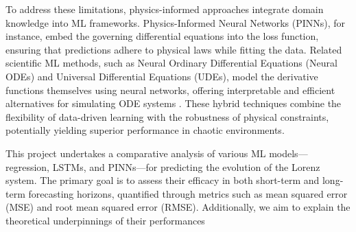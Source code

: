 \documentclass[12pt]{article}
\begin{document}
To address these limitations, physics-informed approaches integrate domain knowledge into ML frameworks. Physics-Informed Neural Networks (PINNs), for instance, embed the governing differential equations into the loss function, ensuring that predictions adhere to physical laws while fitting the data. Related scientific ML methods, such as Neural Ordinary Differential Equations (Neural ODEs) and Universal Differential Equations (UDEs), model the derivative functions themselves using neural networks, offering interpretable and efficient alternatives for simulating ODE systems . These hybrid techniques combine the flexibility of data-driven learning with the robustness of physical constraints, potentially yielding superior performance in chaotic environments.

This project undertakes a comparative analysis of various ML models—regression, LSTMs, and PINNs—for predicting the evolution of the Lorenz system. The primary goal is to assess their efficacy in both short-term and long-term forecasting horizons, quantified through metrics such as mean squared error (MSE) and root mean squared error (RMSE). Additionally, we aim to explain the theoretical underpinnings of their performances




\end{document}
